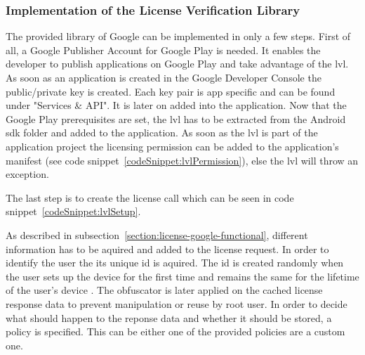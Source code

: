 \subsubsection{Implementation of the License Verification Library} \label{section:license-google-implementation}
The provided library of Google can be implemented in only a few steps.
First of all, a Google Publisher Account for Google Play is needed.
It enables the developer to publish applications on Google Play and take advantage of the \gls{lvl}.
As soon as an application is created in the Google Developer Console the public/private key is created.
Each key pair is app specific and can be found under "Services \& API".
It is later on added into the application. \cite{developersLicensingSetup}
\newline
Now that the Google Play prerequisites are set, the \gls{lvl} has to be extracted from the Android \gls{sdk} folder and added to the application.
As soon as the \gls{lvl} is part of the application project the licensing permission can be added to the application's manifest (see code snippet~\ref{codeSnippet:lvlPermission}), else the \gls{lvl} will throw an exception.

The last step is to create the license call which can be seen in code snippet~\ref{codeSnippet:lvlSetup}.

As described in subsection~\ref{section:license-google-functional}, different information has to be aquired and added to the license request.
In order to identify the user the its unique id is aquired.
The id is created randomly when the user sets up the device for the first time and remains the same for the lifetime of the user's device \cite{androidSecure}.
The obfuscator is later applied on the cached license response data to prevent manipulation or reuse by root user.
In order to decide what should happen to the reponse data and whether it should be stored, a policy is specified.
This can be either one of the provided policies are a custom one.
